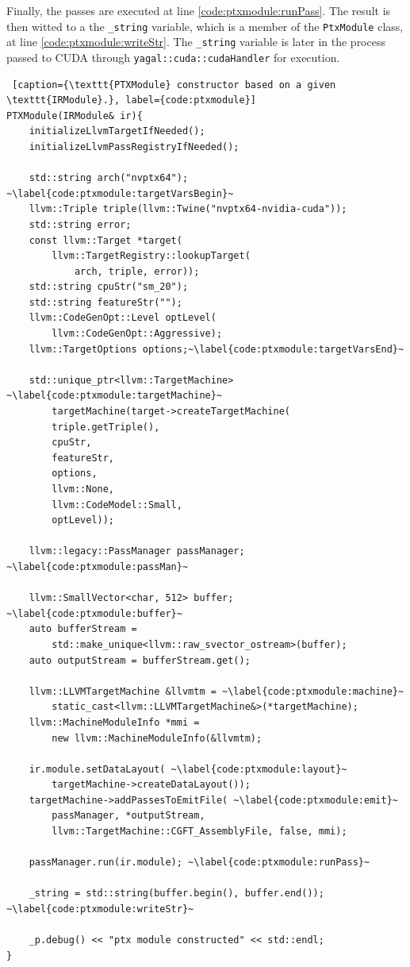 Finally, the passes are executed at line \ref{code:ptxmodule:runPass}. The result is then witted to a the \texttt{\_string} variable, which is a member of the \texttt{PtxModule} class, at line \ref{code:ptxmodule:writeStr}. The \texttt{\_string} variable is later in the process passed to CUDA through \texttt{yagal::cuda::cudaHandler} for execution.

\begin{lstlisting} [caption={\texttt{PTXModule} constructor based on a given \texttt{IRModule}.}, label={code:ptxmodule}]
PTXModule(IRModule& ir){
    initializeLlvmTargetIfNeeded();
    initializeLlvmPassRegistryIfNeeded();

    std::string arch("nvptx64"); ~\label{code:ptxmodule:targetVarsBegin}~
    llvm::Triple triple(llvm::Twine("nvptx64-nvidia-cuda"));
    std::string error;
    const llvm::Target *target(
        llvm::TargetRegistry::lookupTarget(
            arch, triple, error));
    std::string cpuStr("sm_20");
    std::string featureStr("");
    llvm::CodeGenOpt::Level optLevel(
        llvm::CodeGenOpt::Aggressive);
    llvm::TargetOptions options;~\label{code:ptxmodule:targetVarsEnd}~

    std::unique_ptr<llvm::TargetMachine> ~\label{code:ptxmodule:targetMachine}~
        targetMachine(target->createTargetMachine(
        triple.getTriple(), 
        cpuStr, 
        featureStr, 
        options, 
        llvm::None, 
        llvm::CodeModel::Small, 
        optLevel));

    llvm::legacy::PassManager passManager; ~\label{code:ptxmodule:passMan}~

    llvm::SmallVector<char, 512> buffer; ~\label{code:ptxmodule:buffer}~
    auto bufferStream = 
        std::make_unique<llvm::raw_svector_ostream>(buffer);
    auto outputStream = bufferStream.get();

    llvm::LLVMTargetMachine &llvmtm = ~\label{code:ptxmodule:machine}~
        static_cast<llvm::LLVMTargetMachine&>(*targetMachine);
    llvm::MachineModuleInfo *mmi = 
        new llvm::MachineModuleInfo(&llvmtm);

    ir.module.setDataLayout( ~\label{code:ptxmodule:layout}~
        targetMachine->createDataLayout());
    targetMachine->addPassesToEmitFile( ~\label{code:ptxmodule:emit}~
        passManager, *outputStream, 
        llvm::TargetMachine::CGFT_AssemblyFile, false, mmi);

    passManager.run(ir.module); ~\label{code:ptxmodule:runPass}~

    _string = std::string(buffer.begin(), buffer.end()); ~\label{code:ptxmodule:writeStr}~

    _p.debug() << "ptx module constructed" << std::endl;
}
\end{lstlisting}